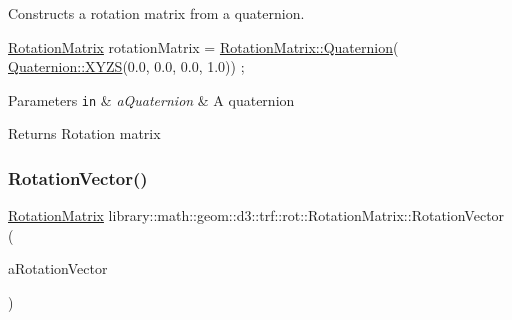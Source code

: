 Constructs a rotation matrix from a quaternion. 


\begin{DoxyCode}
\hyperlink{classlibrary_1_1math_1_1geom_1_1d3_1_1trf_1_1rot_1_1_rotation_matrix_a7f1184694020cb4f963d58931324ab06}{RotationMatrix} rotationMatrix = \hyperlink{classlibrary_1_1math_1_1geom_1_1d3_1_1trf_1_1rot_1_1_rotation_matrix_a55511f2734e537277092905958d56d23}{RotationMatrix::Quaternion}(
      \hyperlink{classlibrary_1_1math_1_1geom_1_1d3_1_1trf_1_1rot_1_1_quaternion_a006294eb483bcfc352c2dc36cf19ceec}{Quaternion::XYZS}(0.0, 0.0, 0.0, 1.0)) ;
\end{DoxyCode}



\begin{DoxyParams}[1]{Parameters}
\mbox{\tt in}  & {\em a\+Quaternion} & A quaternion \\
\hline
\end{DoxyParams}
\begin{DoxyReturn}{Returns}
Rotation matrix 
\end{DoxyReturn}
\mbox{\label{classlibrary_1_1math_1_1geom_1_1d3_1_1trf_1_1rot_1_1_rotation_matrix_a1f7367f6d38b55e05623df62a8ea0be4}} 
\subsubsection{\texorpdfstring{Rotation\+Vector()}{RotationVector()}}
{\footnotesize\ttfamily \hyperlink{classlibrary_1_1math_1_1geom_1_1d3_1_1trf_1_1rot_1_1_rotation_matrix}{Rotation\+Matrix} library\+::math\+::geom\+::d3\+::trf\+::rot\+::\+Rotation\+Matrix\+::\+Rotation\+Vector (\begin{DoxyParamCaption}\item[{const \hyperlink{classlibrary_1_1math_1_1geom_1_1d3_1_1trf_1_1rot_1_1_rotation_vector}{rot\+::\+Rotation\+Vector} \&}]{a\+Rotation\+Vector }\end{DoxyParamCaption})\hspace{0.3cm}{\ttfamily [static]}}



